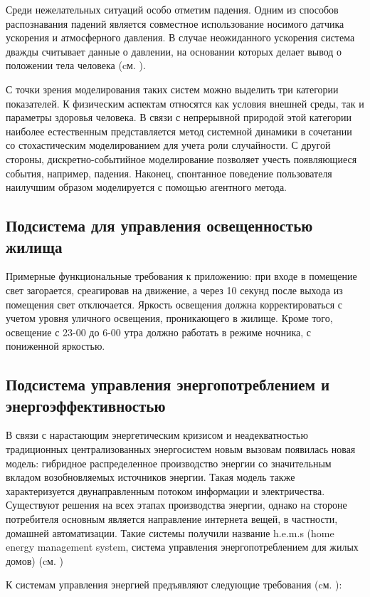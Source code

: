 Среди нежелательных ситуаций особо отметим падения. Одним из способов распознавания падений является совместное использование носимого датчика ускорения и атмосферного давления. В случае неожиданного ускорения система дважды считывает данные о давлении, на основании которых делает вывод о положении тела человека (cм. ).

С точки зрения моделирования таких систем можно выделить три категории показателей. К физическим аспектам относятся как условия внешней среды, так и параметры здоровья человека. В связи с непрерывной природой этой категории наиболее естественным представляется метод системной динамики в сочетании со стохастическим моделированием для учета роли случайности. С другой стороны, дискретно-событийное моделирование позволяет учесть появляющиеся события, например, падения. Наконец, спонтанное поведение пользователя наилучшим образом моделируется с помощью агентного метода.

\subsection{Подсистема для управления освещенностью жилища}
Примерные функциональные требования к приложению: при входе в помещение свет загорается, среагировав на движение, а через 10 секунд после выхода из помещения свет отключается. Яркость освещения должна корректироваться с учетом уровня уличного освещения, проникающего в жилище. Кроме того, освещение с 23-00 до 6-00 утра должно работать в режиме ночника, с пониженной яркостью.

\subsection{Подсистема управления энергопотреблением и энергоэффективностью}
В связи с нарастающим энергетическим кризисом и неадекватностью традиционных централизованных энергосистем новым вызовам появилась новая модель: гибридное распределенное производство энергии со значительным вкладом возобновляемых источников энергии. Такая модель также характеризуется двунаправленным потоком информации и электричества. Существуют решения на всех этапах производства энергии, однако на стороне потребителя основным является направление интернета вещей, в частности, домашней автоматизации. Такие системы получили название h.e.m.s (home energy management system, система управления энергопотреблением для жилых домов) (cм. )

К системам управления энергией предъявляют следующие требования (cм. ):

